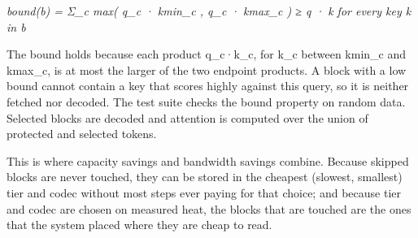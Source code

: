\documentclass[12pt,a4paper]{report}
\begin{document}
\begin{center}\small\textit{bound(b) = Σ\_\allowbreak{}c max( q\_\allowbreak{}c · kmin\_\allowbreak{}c , q\_\allowbreak{}c · kmax\_\allowbreak{}c ) ≥ q · k   for every key k in b}\end{center}
The bound holds because each product q\_\allowbreak{}c·k\_\allowbreak{}c, for k\_\allowbreak{}c between kmin\_\allowbreak{}c and kmax\_\allowbreak{}c, is at most the larger of the two endpoint products. A block with a low bound cannot contain a key that scores highly against this query, so it is neither fetched nor decoded. The test suite checks the bound property on random data. Selected blocks are decoded and attention is computed over the union of protected and selected tokens.

This is where capacity savings and bandwidth savings combine. Because skipped blocks are never touched, they can be stored in the cheapest (slowest, smallest) tier and codec without most steps ever paying for that choice; and because tier and codec are chosen on measured heat, the blocks that are touched are the ones that the system placed where they are cheap to read.
\end{document}
